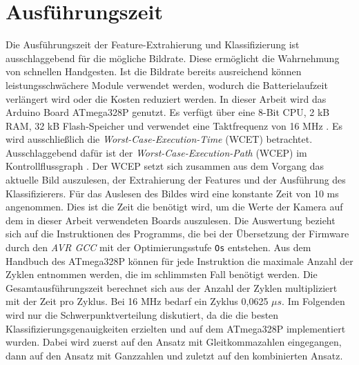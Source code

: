 \section{Ausführungszeit}
\label{sec:eval_speed}
Die Ausführungszeit der Feature-Extrahierung und Klassifizierung ist ausschlaggebend für die mögliche Bildrate. Diese ermöglicht die Wahrnehmung von schnellen Handgesten. Ist die Bildrate bereits ausreichend
können leistungsschwächere Module verwendet werden, wodurch die Batterielaufzeit verlängert wird oder die Kosten reduziert werden.
In dieser Arbeit wird das Arduino Board ATmega328P genutzt. Es verfügt über eine 8-Bit CPU, 2 kB RAM, 32 kB Flash-Speicher und verwendet eine Taktfrequenz von 16 MHz \cite{atmega328p}.
\newline
\newline
Es wird ausschließlich die \textit{Worst-Case-Execution-Time} (WCET) betrachtet. Ausschlaggebend dafür ist der \textit{Worst-Case-Execution-Path} (WCEP) im Kontrollflussgraph \cite{wcc_intro}. Der WCEP
setzt sich zusammen aus dem Vorgang das aktuelle Bild auszulesen, der Extrahierung der Features und der Ausführung des Klassifizierers. Für das Auslesen des Bildes wird eine konstante Zeit von 10 ms angenommen.
Dies ist die Zeit die benötigt wird, um die Werte der Kamera auf dem in dieser Arbeit verwendeten Boards auszulesen.
\newline
\newline
Die Auswertung bezieht sich auf die Instruktionen des Programms, die bei der Übersetzung der Firmware durch den \textit{AVR GCC} mit der Optimierungsstufe \texttt{Os} entstehen. Aus dem Handbuch des
ATmega328P \cite{atmega328p} können für jede Instruktion die maximale Anzahl der Zyklen entnommen werden, die im schlimmsten Fall benötigt werden. Die Gesamtausführungszeit berechnet sich aus der Anzahl der Zyklen
multipliziert mit der Zeit pro Zyklus. Bei 16 MHz bedarf ein Zyklus 0,0625 $\mu s$.
\newline
\newline
Im Folgenden wird nur die Schwerpunktverteilung diskutiert, da die die besten Klassifizierungsgenauigkeiten erzielten und auf dem ATmega328P implementiert wurden. Dabei wird zuerst auf den Ansatz mit Gleitkommazahlen
eingegangen, dann auf den Ansatz mit Ganzzahlen und zuletzt auf den kombinierten Ansatz.





